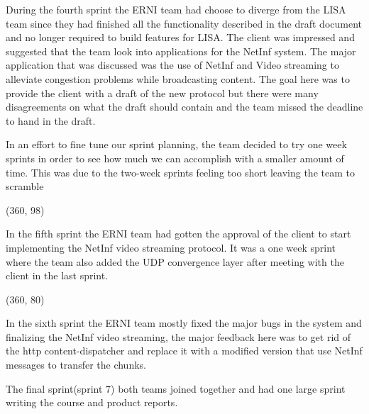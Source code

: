 During the fourth sprint the ERNI team had choose to diverge from the LISA team since they had finished all the functionality described in the draft document and no longer required to build features for LISA. The client was impressed and suggested that the team look into applications for the NetInf system. The major application that was discussed was the use of NetInf and Video streaming to alleviate congestion problems while broadcasting content. The goal here was to provide the client with a draft of the new protocol but there were many disagreements on what the draft should contain and the team missed the deadline to hand in the draft.

In an effort to fine tune our sprint planning, the team decided to try one week sprints in order to see how much we can accomplish with a smaller amount of time. This was due to the two-week sprints feeling too short leaving the team to scramble

\framebox(360, 98){
	
}

In the fifth sprint the ERNI team had gotten the approval of the client to start implementing the NetInf video streaming protocol. It was a one week sprint where the team also added the UDP convergence layer after meeting with the client in the last sprint.


\framebox(360, 80){
}

In the sixth sprint the ERNI team mostly fixed the major bugs in the system and finalizing the NetInf video streaming, the major feedback here was to get rid of the http content-dispatcher and replace it with a modified version that use NetInf messages to transfer the chunks.

The final sprint(sprint 7) both teams joined together and had one large sprint writing the course and product reports.
